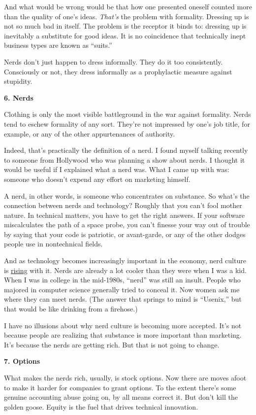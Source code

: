 \documentclass[12pt]{book}
\begin{document}
And what would be wrong would be that how one presented oneself counted
more than the quality of one's ideas. \emph{That's} the problem with
formality. Dressing up is not so much bad in itself. The problem is the
receptor it binds to: dressing up is inevitably a substitute for good
ideas. It is no coincidence that technically inept business types are
known as ``suits.''

Nerds don't just happen to dress informally. They do it too
consistently. Consciously or not, they dress informally as a
prophylactic measure against stupidity.

\textbf{6. Nerds}

Clothing is only the most visible battleground in the war against
formality. Nerds tend to eschew formality of any sort. They're not
impressed by one's job title, for example, or any of the other
appurtenances of authority.

Indeed, that's practically the definition of a nerd. I found myself
talking recently to someone from Hollywood who was planning a show about
nerds. I thought it would be useful if I explained what a nerd was. What
I came up with was: someone who doesn't expend any effort on marketing
himself.

A nerd, in other words, is someone who concentrates on substance. So
what's the connection between nerds and technology? Roughly that you
can't fool mother nature. In technical matters, you have to get the
right answers. If your software miscalculates the path of a space probe,
you can't finesse your way out of trouble by saying that your code is
patriotic, or avant-garde, or any of the other dodges people use in
nontechnical fields.

And as technology becomes increasingly important in the economy, nerd
culture is \href{nerdad.html}{rising} with it. Nerds are already a lot
cooler than they were when I was a kid. When I was in college in the
mid-1980s, ``nerd'' was still an insult. People who majored in computer
science generally tried to conceal it. Now women ask me where they can
meet nerds. (The answer that springs to mind is ``Usenix,'' but that
would be like drinking from a firehose.)

I have no illusions about why nerd culture is becoming more accepted.
It's not because people are realizing that substance is more important
than marketing. It's because the nerds are getting rich. But that is not
going to change.

\textbf{7. Options}

What makes the nerds rich, usually, is stock options. Now there are
moves afoot to make it harder for companies to grant options. To the
extent there's some genuine accounting abuse going on, by all means
correct it. But don't kill the golden goose. Equity is the fuel that
drives technical innovation.
\end{document}
